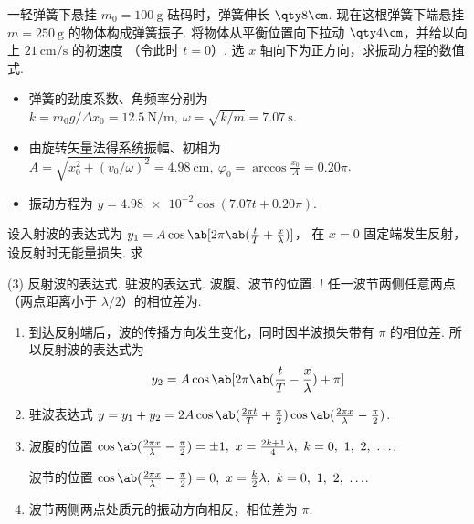 \begin{problem}[本题6分]
  一轻弹簧下悬挂 $m_0 = \qty{100}\g$ 砝码时，弹簧伸长 $\qty8\cm$.
  现在这根弹簧下端悬挂 $m = \qty{250}\g$ 的物体构成弹簧振子.
  将物体从平衡位置向下拉动 $\qty4\cm$，并给以向上 $\qty{21}{\cm/\s}$ 的初速度
  （令此时 $t = 0$）. 选 $x$ 轴向下为正方向，求振动方程的数值式.
\end{problem}
\scratch[4ex]
\begin{solution}\leavevmode
  \begin{itemize}
    \item 弹簧的劲度系数、角频率分别为 $k = m_0g/\Delta x_0 = \qty{12.5}{\N/\m},~
    \omega = \sqrt{k/m} = \qty{7.07}\s$.
    \item 由旋转矢量法得系统振幅、初相为
    $A = \sqrt{x_0^2 + (v_0/\omega)^2} = \qty{4.98}\cm,~
    \varphi_0 = \arccos{\frac{x_0}{A}} = 0.20\pi$.
    \item 振动方程为 $y = \num{4.98e-2}\cos(7.07t + 0.20\pi)$.
  \end{itemize}
\end{solution}

\begin{problem}[本题8分]
  设入射波的表达式为 $y_1 = A\cos\ab[2\pi\ab(\frac tT + \frac x\lambda)]$，
  在 $x = 0$ 固定端发生反射，设反射时无能量损失. 求
  \begin{tasks}[ label = \arabic*. ](3)
    \task 反射波的表达式.
    \task 驻波的表达式.
    \task 波腹、波节的位置.
    \task! 任一波节两侧任意两点（两点距离小于 $\lambda/2$）的相位差为\result{$\pi$}.
  \end{tasks}
\end{problem}
\scratch[4ex]
\begin{solution}\leavevmode
  \begin{enumerate}
    \item 到达反射端后，波的传播方向发生变化，同时因半波损失带有 $\pi$ 的相位差.
    所以反射波的表达式为
    \[y_2 = A\cos\ab[2\pi\ab(\frac tT - \frac x\lambda) + \pi]\]
    \item 驻波表达式
    $ y = y_1 + y_2
        = 2A\cos\ab(\frac{2\pi t}{T} + \frac\pi2)
            \cos\ab(\frac{2\pi x}{\lambda} - \frac\pi2)$.
    \item 
    波腹的位置 $\cos\ab(\frac{2\pi x}{\lambda} - \frac\pi2) = \pm 1,~
    x = \frac{2k+1}{4}\lambda,~ k = 0,~ 1,~ 2,~ \ldots$.

    波节的位置 $\cos\ab(\frac{2\pi x}{\lambda} - \frac\pi2) = 0,~
    x = \frac k2\lambda,~ k = 0,~ 1,~ 2,~ \ldots$.
    \item 波节两侧两点处质元的振动方向相反，相位差为 $\pi$.
  \end{enumerate}
\end{solution}

